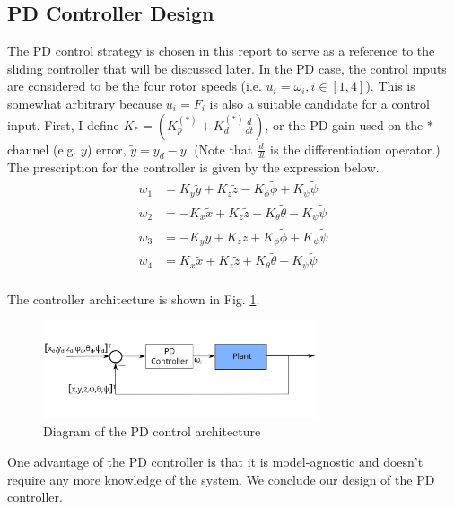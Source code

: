 \documentclass[conference]{IEEEtran}
\begin{document}
\subsection{PD Controller Design}
The PD control strategy is chosen in this report to serve as a reference to the sliding controller that will be discussed later. In the PD case, the control inputs are considered to be the four rotor speeds (i.e. $u_i = \omega_i, i \in [1,4]$). This is somewhat arbitrary because $u_i = F_i$ is also a suitable candidate for a control input. First, I define $K_* = (K_p^{(*)} +K_d^{(*)}\frac{d}{dt})$, or the PD gain used on the $*$ channel (e.g. $y$) error, $\widetilde{y} = y_d - y$. (Note that $\frac{d}{dt}$ is the differentiation operator.) The prescription for the controller is given by the expression below.
\begin{align*}
w_1 &= K_y\widetilde{y} + K_z\widetilde{z} - K_\phi\widetilde{\phi} + K_\psi\widetilde{\psi} \\
w_2 &= -K_x\widetilde{x} + K_z\widetilde{z} - K_\theta\widetilde{\theta} - K_\psi\widetilde{\psi} \\
w_3 &= -K_y\widetilde{y} + K_z\widetilde{z} + K_\phi\widetilde{\phi} + K_\psi\widetilde{\psi} \\
w_4 &= K_x\widetilde{x} + K_z\widetilde{z} + K_\theta\widetilde{\theta} - K_\psi\widetilde{\psi} \\
\end{align*}

The controller architecture is shown in Fig. \ref{fig:pd_controller}.
\begin{figure}[!ht]
\centering
\includegraphics[width=3.2in]{images/pd_controller.png}
\caption{Diagram of the PD control architecture}
\label{fig:pd_controller}
\end{figure}
One advantage of the PD controller is that it is model-agnostic and doesn't require any more knowledge of the system. We conclude our design of the PD controller.
\end{document}
